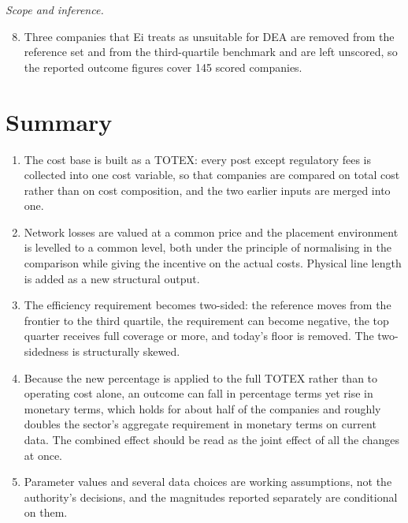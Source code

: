 \textit{Scope and inference.}
\begin{enumerate}\setcounter{enumi}{7}
  \item Three companies that Ei treats as unsuitable for DEA are removed from the reference set and
    from the third-quartile benchmark and are left unscored, so the reported outcome figures cover
    145 scored companies.
\end{enumerate}

\section{Summary}
\label{sec:summary}

\begin{enumerate}
  \item The cost base is built as a TOTEX: every post except regulatory fees is collected into one
    cost variable, so that companies are compared on total cost rather than on cost composition, and
    the two earlier inputs are merged into one.
  \item Network losses are valued at a common price and the placement environment is levelled to a
    common level, both under the principle of normalising in the comparison while giving the
    incentive on the actual costs. Physical line length is added as a new structural output.
  \item The efficiency requirement becomes two-sided: the reference moves from the frontier to the
    third quartile, the requirement can become negative, the top quarter receives full coverage or
    more, and today's floor is removed. The two-sidedness is structurally skewed.
  \item Because the new percentage is applied to the full TOTEX rather than to operating cost alone,
    an outcome can fall in percentage terms yet rise in monetary terms, which holds for about half of the
    companies and roughly doubles the sector's aggregate requirement in monetary terms on current data. The
    combined effect should be read as the joint effect of all the changes at once.
  \item Parameter values and several data choices are working assumptions, not the authority's
    decisions, and the magnitudes reported separately are conditional on them.
\end{enumerate}





